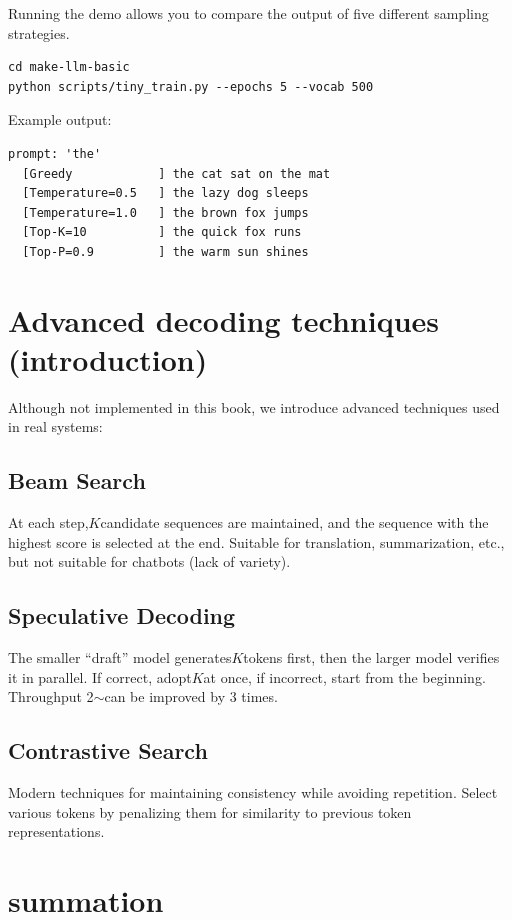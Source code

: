 Running the demo allows you to compare the output of five different sampling strategies.

\begin{lstlisting}[style=bashstyle]
cd make-llm-basic
python scripts/tiny_train.py --epochs 5 --vocab 500
\end{lstlisting}

Example output:
\begin{lstlisting}[basicstyle=\ttfamily\footnotesize, backgroundcolor=\color{codebg}, frame=single]
prompt: 'the'
  [Greedy            ] the cat sat on the mat
  [Temperature=0.5   ] the lazy dog sleeps
  [Temperature=1.0   ] the brown fox jumps
  [Top-K=10          ] the quick fox runs
  [Top-P=0.9         ] the warm sun shines
\end{lstlisting}

\section{Advanced decoding techniques (introduction)}

Although not implemented in this book, we introduce advanced techniques used in real systems:

\subsection{Beam Search}
At each step,$K$candidate sequences are maintained, and the sequence with the highest score is selected at the end. Suitable for translation, summarization, etc., but not suitable for chatbots (lack of variety).

\subsection{Speculative Decoding}
The smaller ``draft'' model generates$K$tokens first, then the larger model verifies it in parallel. If correct, adopt$K$at once, if incorrect, start from the beginning. Throughput 2$\sim$can be improved by 3 times.

\subsection{Contrastive Search}
Modern techniques for maintaining consistency while avoiding repetition. Select various tokens by penalizing them for similarity to previous token representations.

\section{summation}

